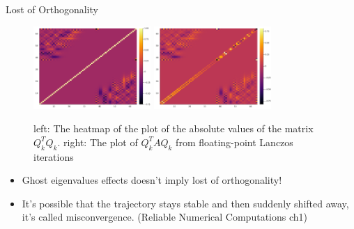 \documentclass{beamer}
\begin{document}
    \begin{frame}{Lost of Orthogonality}
        \begin{figure}[H]
            \centering
            \includegraphics[width=12em]{fig3.png}
            \includegraphics[width=12em]{fig4.png}
             \caption{left: The heatmap of the plot of the absolute values of the matrix $Q^T_kQ_k$. right: The plot of $Q_k^TAQ_k$ from floating-point Lanczos iterations}
        \end{figure}
        \begin{itemize}
            \item Ghost eigenvalues effects doesn't imply lost of orthogonality!
            \item It's possible that the trajectory stays stable and then suddenly shifted away, it's called misconvergence. (Reliable Numerical Computations ch1\cite{book:reliable_computation})
        \end{itemize}
    \end{frame}
\end{document}
